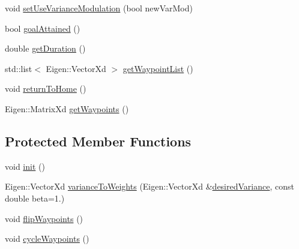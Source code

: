 \begin{DoxyCompactItemize}
\item 
void \hyperlink{classocra__recipes_1_1TrajectoryThread_a230269a0ce3617e924a72b021adb6892}{set\+Use\+Variance\+Modulation} (bool new\+Var\+Mod)
\item 
bool \hyperlink{classocra__recipes_1_1TrajectoryThread_acd000c1ffee3b03d2756b04dba583285}{goal\+Attained} ()
\item 
double \hyperlink{classocra__recipes_1_1TrajectoryThread_ade0f6fb6c7c139dc2f09398f1464200b}{get\+Duration} ()
\item 
std\+::list$<$ Eigen\+::\+Vector\+Xd $>$ \hyperlink{classocra__recipes_1_1TrajectoryThread_a78ac745efb132b69d7129f1e9212ad87}{get\+Waypoint\+List} ()
\item 
void \hyperlink{classocra__recipes_1_1TrajectoryThread_ac1335eaa6c85597cab894673ef9a56f9}{return\+To\+Home} ()
\item 
Eigen\+::\+Matrix\+Xd \hyperlink{classocra__recipes_1_1TrajectoryThread_ae6830df6ce18f3a6f5656fe345b05731}{get\+Waypoints} ()
\end{DoxyCompactItemize}
\subsection*{Protected Member Functions}
\begin{DoxyCompactItemize}
\item 
void \hyperlink{classocra__recipes_1_1TrajectoryThread_a55a2e93d3706b500338c70d4e1c406ba}{init} ()
\item 
Eigen\+::\+Vector\+Xd \hyperlink{classocra__recipes_1_1TrajectoryThread_a80547ba585263055ad226a386ef18313}{variance\+To\+Weights} (Eigen\+::\+Vector\+Xd \&\hyperlink{classocra__recipes_1_1TrajectoryThread_a86a09c83fbbf2b7a22469a3476204b24}{desired\+Variance}, const double beta=1.)
\item 
void \hyperlink{classocra__recipes_1_1TrajectoryThread_aa7dfe52d95ee048e1e5fbf6ed7a820bd}{flip\+Waypoints} ()
\item 
void \hyperlink{classocra__recipes_1_1TrajectoryThread_a82672124920b0707e3b530d8826ce240}{cycle\+Waypoints} ()
\end{DoxyCompactItemize}
